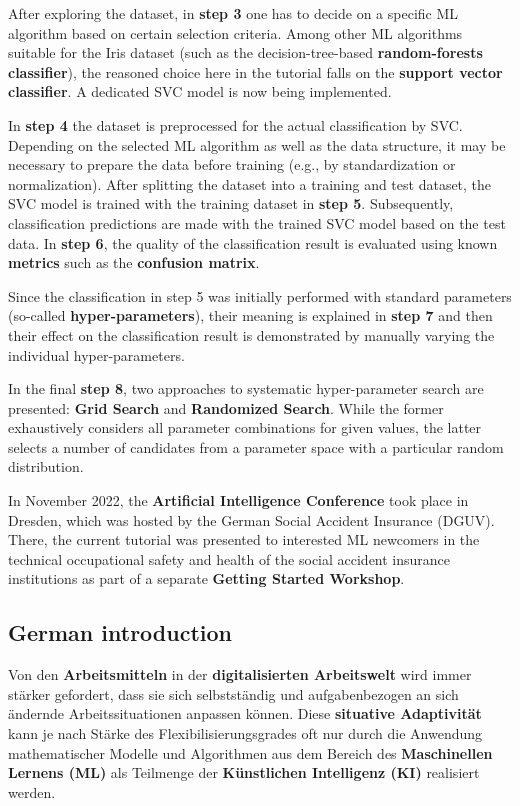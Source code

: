 \documentclass [oneside,10pt,a4paper,ngerman,BCOR10mm,headsepline,parindent,final]{scrartcl}
\begin{document}
After exploring the dataset, in \textbf{step 3} one has to decide on a
specific ML algorithm based on certain selection criteria. Among other
ML algorithms suitable for the Iris dataset (such as the
decision-tree-based \textbf{random-forests classifier}), the reasoned
choice here in the tutorial falls on the \textbf{support vector
classifier}. A dedicated SVC model is now being implemented.

In \textbf{step 4} the dataset is preprocessed for the actual
classification by SVC. Depending on the selected ML algorithm as well as
the data structure, it may be necessary to prepare the data before
training (e.g., by standardization or normalization). After splitting
the dataset into a training and test dataset, the SVC model is trained
with the training dataset in \textbf{step 5}. Subsequently,
classification predictions are made with the trained SVC model based on
the test data. In \textbf{step 6}, the quality of the classification
result is evaluated using known \textbf{metrics} such as the
\textbf{confusion matrix}.

Since the classification in step 5 was initially performed with standard
parameters (so-called \textbf{hyper-parameters}), their meaning is
explained in \textbf{step 7} and then their effect on the classification
result is demonstrated by manually varying the individual
hyper-parameters.

In the final \textbf{step 8}, two approaches to systematic
hyper-parameter search are presented: \textbf{Grid Search} and
\textbf{Randomized Search}. While the former exhaustively considers all
parameter combinations for given values, the latter selects a number of
candidates from a parameter space with a particular random distribution.

In November 2022, the \textbf{Artificial Intelligence Conference} took
place in Dresden, which was hosted by the German Social Accident
Insurance (DGUV). There, the current tutorial was presented to
interested ML newcomers in the technical occupational safety and health
of the social accident insurance institutions as part of a separate
\textbf{Getting Started Workshop}.

    \hypertarget{german-introduction}{%
\subsection{German introduction}\label{german-introduction}}

Von den \textbf{Arbeitsmitteln} in der \textbf{digitalisierten
Arbeitswelt} wird immer stärker gefordert, dass sie sich selbstständig
und aufgabenbezogen an sich ändernde Arbeitssituationen anpassen können.
Diese \textbf{situative Adaptivität} kann je nach Stärke des
Flexibilisierungsgrades oft nur durch die Anwendung mathematischer
Modelle und Algorithmen aus dem Bereich des \textbf{Maschinellen Lernens
(ML)} als Teilmenge der \textbf{Künstlichen Intelligenz (KI)} realisiert
werden.
\end{document}
